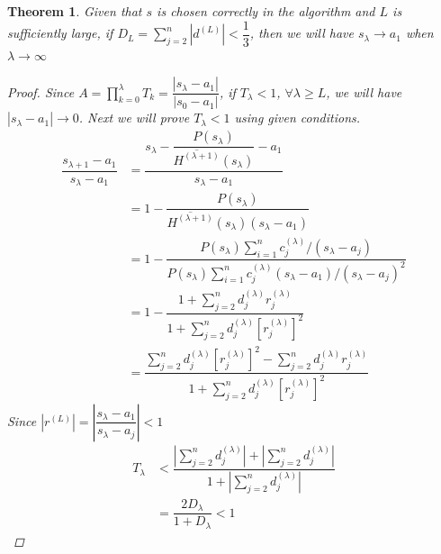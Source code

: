 \documentclass[11pt]{article}
\newtheorem{theorem}{Theorem}[section]
\begin{document}
\begin{theorem}
	Given that $s$ is chosen correctly in the algorithm and $L$ is sufficiently large, if $D_L=\sum_{j=2}^{n}|d^{(L)}|< \dfrac{1}{3}$, then we will have $s_\lambda\rightarrow a_1$ when $\lambda\rightarrow\infty$
	\begin{proof}
		Since $A=\prod_{k=0}^{\lambda} T_k=\dfrac{|s_{\lambda}-a_1|}{|s_{0}-a_1|}$, if $T_\lambda<1$, $\forall\lambda\ge L$, we will have $|s_\lambda-a_1|\rightarrow0$. Next we will prove $T_\lambda<1$ using given conditions.
		\begin{align}
			\dfrac{s_{\lambda+1}-a_1}{s_{\lambda}-a_1}&=
			\dfrac{s_\lambda-\dfrac{P(s_\lambda)}{\overline{H^{(\lambda+1)}}(s_\lambda)}-a_1}{s_{\lambda}-a_1}\\
			&=1-\dfrac{P(s_\lambda)}{\overline{H^{(\lambda+1)}}(s_\lambda)(s_\lambda-a_1)}\\
			&=1-\dfrac{P(s_\lambda)\sum_{i=1}^{n}c^{(\lambda)}_j/(s_\lambda-a_j)}{P(s_\lambda)\sum_{i=1}^{n}c^{(\lambda)}_j(s_\lambda-a_1)/(s_\lambda-a_j)^2}\\
			&=1-\dfrac{1+\sum_{j=2}^{n}d^{(\lambda)}_jr^{(\lambda)}_j}{1+\sum_{j=2}^{n}d^{(\lambda)}_j[r^{(\lambda)}_j]^2}\\
			&=\dfrac{\sum_{j=2}^{n}d^{(\lambda)}_j[r^{(\lambda)}_j]^2-\sum_{j=2}^{n}d^{(\lambda)}_jr^{(\lambda)}_j}{1+\sum_{j=2}^{n}d^{(\lambda)}_j[r^{(\lambda)}_j]^2}
		\end{align}
		Since $|r^{(L)}|=|\dfrac{s_\lambda-a_1}{s_\lambda-a_j}|<1$
		\begin{align*}
			T_\lambda&<\dfrac{|\sum_{j=2}^{n}d^{(\lambda)}_j|+|\sum_{j=2}^{n}d^{(\lambda)}_j|}{1+|\sum_{j=2}^{n}d^{(\lambda)}_j|}\\&=\dfrac{2D_\lambda}{1+D_\lambda}<1
		\end{align*}
	\end{proof}
\end{theorem}
\end{document}
